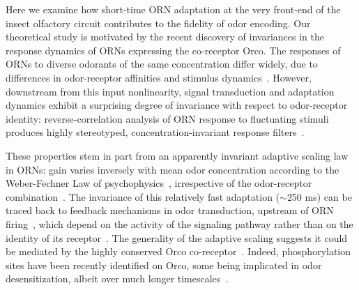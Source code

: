 \documentclass[10pt,prl,aps,showpacs,twocolumn,unsortedaddress]{revtex4-1}
\begin{document}
Here we examine how short-time ORN adaptation at the very front-end of the insect olfactory circuit contributes to the fidelity of odor encoding. Our theoretical study is motivated by the recent discovery of invariances in the response dynamics of ORNs expressing the co-receptor Orco. %
The responses of ORNs to diverse odorants of the same concentration differ widely, due to differences in odor-receptor affinities \cite{hallem_carlson,montague2011similar,geosmin} and stimulus dynamics~\cite{martelli}. However, downstream from this input nonlinearity, signal transduction and adaptation dynamics exhibit a surprising degree of invariance with respect to odor-receptor identity: reverse-correlation analysis of ORN response to fluctuating stimuli produces highly stereotyped, concentration-invariant response filters~\cite{martelli,si2017invariances, srinivas_elife}.

These properties stem in part from an apparently invariant adaptive scaling law in ORNs: gain varies inversely with mean odor concentration according to the Weber-Fechner Law of psychophysics~\cite{weber1996eh,fechner2012elemente}, irrespective of the odor-receptor combination~\cite{srinivas_elife,cafaro_WL,cao_WL}. The invariance of this relatively fast adaptation ($\sim$250 ms) can be traced back to  feedback mechanisms in odor transduction, upstream of ORN firing~\cite{nagel_wilson_biophysical,cao_WL,cafaro_WL,srinivas_elife}, which depend on the activity of the signaling pathway rather than on the identity of its receptor~\cite{nagel_wilson_biophysical}. 
The generality of the adaptive scaling suggests it could be mediated by the highly conserved Orco co-receptor~\cite{orco_structure,getahun2013insect,getahun2016intracellular,Guo_Smith}. Indeed, phosphorylation sites have been recently identified on Orco, some being implicated in odor desensitization, albeit over much longer timescales~\cite{Guo_Smith_review,Guo_Smith}. 
\end{document}
